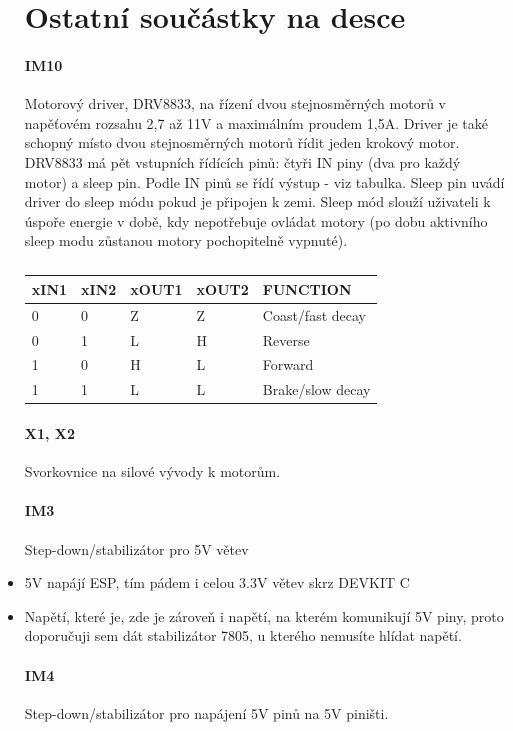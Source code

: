 \documentclass{template/socthesis}
\begin{document}
\begin{itemize}
	\section{Ostatní součástky na desce}
	
	\paragraph*{IM10}
	Motorový driver, DRV8833, na řízení dvou stejnosměrných motorů v napěťovém rozsahu 2,7 až 11V a maximálním proudem 1,5A. 
	Driver je také schopný místo dvou stejnosměrných motorů řídit jeden krokový motor.
	DRV8833 má pět vstupních řídících pinů: čtyři IN piny (dva pro každý motor) a sleep pin.  Podle IN pinů se řídí výstup - viz tabulka.
	Sleep pin uvádí driver do sleep módu pokud je připojen k zemi. Sleep mód slouží uživateli k úspoře energie v době, kdy nepotřebuje ovládat motory (po dobu aktivního sleep modu zůstanou motory pochopitelně vypnuté).
	
	\begin{table}[h]
		\centering
		\begin{tabular}{|l|l|l|l|l|}
			\hline
			xIN1 & xIN2 & xOUT1 & xOUT2 & FUNCTION \\ \hline
			0 & 0 & Z & Z & Coast/fast decay \\ 
			0 & 1 & L & H & Reverse \\ 
			1 & 0 & H & L & Forward \\ 
			1 & 1 & L & L & Brake/slow decay \\ 
			\hline
		\end{tabular}
		\caption{}
	\end{table}
	\newpage
	\paragraph*{X1, X2}
	Svorkovnice na silové vývody k motorům.
	
	\paragraph*{IM3}
	Step-down/stabilizátor pro 5V větev
	\item 5V napájí ESP, tím pádem i celou 3.3V větev skrz DEVKIT C
	\item Napětí, které je, zde je zároveň i napětí, na kterém komunikují 5V piny, proto doporučuji sem dát stabilizátor 7805, u kterého nemusíte hlídat napětí.
	
	\paragraph*{IM4}
	Step-down/stabilizátor pro napájení 5V pinů na 5V piništi.
	

\end{itemize}
\end{document}
